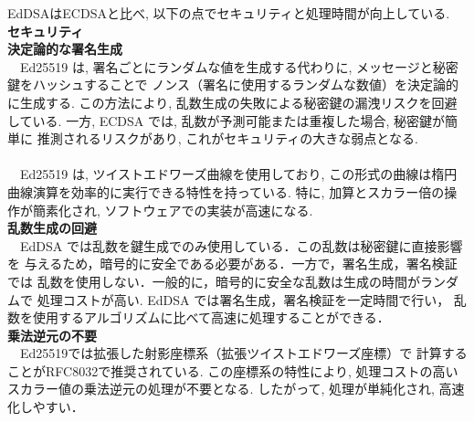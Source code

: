 EdDSAはECDSAと比べ, 以下の点でセキュリティと処理時間が向上している.\\[1em]
{\large\textbf{セキュリティ}}\\[1em]
\noindent\textbf{決定論的な署名生成}\\
　Ed25519 は, 署名ごとにランダムな値を生成する代わりに, 
メッセージと秘密鍵をハッシュすることで 
ノンス（署名に使用するランダムな数値）を決定論的に生成する.
この方法により, 乱数生成の失敗による秘密鍵の漏洩リスクを回避している.
一方, ECDSA では, 乱数が予測可能または重複した場合, 秘密鍵が簡単に
推測されるリスクがあり, これがセキュリティの大きな弱点となる.\\[1em]
\\[1em]
　Ed25519 は, ツイストエドワーズ曲線を使用しており, 
この形式の曲線は楕円曲線演算を効率的に実行できる特性を持っている.
特に, 加算とスカラー倍の操作が簡素化され, ソフトウェアでの実装が高速になる.\\

\noindent\textbf{乱数生成の回避} \leavevmode\\
　EdDSA では乱数を鍵生成でのみ使用している．この乱数は秘密鍵に直接影響を
与えるため，暗号的に安全である必要がある．一方で，署名生成，署名検証では
乱数を使用しない．一般的に，暗号的に安全な乱数は生成の時間がランダムで
処理コストが高い. EdDSA では署名生成，署名検証を一定時間で行い，
乱数を使用するアルゴリズムに比べて高速に処理することができる．\\

\noindent\textbf{乗法逆元の不要} \leavevmode\\
　Ed25519では拡張した射影座標系（拡張ツイストエドワーズ座標）で
計算することがRFC8032で推奨されている.
この座標系の特性により, 処理コストの高いスカラー値の乗法逆元の処理が不要となる. 
したがって, 処理が単純化され,  高速化しやすい．

